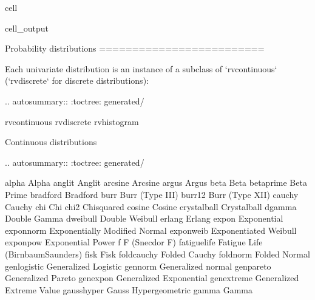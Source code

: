 \documentclass[letterpaper,10pt,english]{jupyterBook}
\begin{document}
\begin{sphinxuseclass}{cell}
\begin{sphinxVerbatimOutput}
\begin{sphinxuseclass}{cell_output}
\begin{sphinxVerbatim}[commandchars=\\\{\}]
Probability distributions
=========================

Each univariate distribution is an instance of a subclass of `rv\PYGZus{}continuous`
(`rv\PYGZus{}discrete` for discrete distributions):

.. autosummary::
   :toctree: generated/

   rv\PYGZus{}continuous
   rv\PYGZus{}discrete
   rv\PYGZus{}histogram

Continuous distributions
\PYGZhy{}\PYGZhy{}\PYGZhy{}\PYGZhy{}\PYGZhy{}\PYGZhy{}\PYGZhy{}\PYGZhy{}\PYGZhy{}\PYGZhy{}\PYGZhy{}\PYGZhy{}\PYGZhy{}\PYGZhy{}\PYGZhy{}\PYGZhy{}\PYGZhy{}\PYGZhy{}\PYGZhy{}\PYGZhy{}\PYGZhy{}\PYGZhy{}\PYGZhy{}\PYGZhy{}

.. autosummary::
   :toctree: generated/

   alpha             \PYGZhy{}\PYGZhy{} Alpha
   anglit            \PYGZhy{}\PYGZhy{} Anglit
   arcsine           \PYGZhy{}\PYGZhy{} Arcsine
   argus             \PYGZhy{}\PYGZhy{} Argus
   beta              \PYGZhy{}\PYGZhy{} Beta
   betaprime         \PYGZhy{}\PYGZhy{} Beta Prime
   bradford          \PYGZhy{}\PYGZhy{} Bradford
   burr              \PYGZhy{}\PYGZhy{} Burr (Type III)
   burr12            \PYGZhy{}\PYGZhy{} Burr (Type XII)
   cauchy            \PYGZhy{}\PYGZhy{} Cauchy
   chi               \PYGZhy{}\PYGZhy{} Chi
   chi2              \PYGZhy{}\PYGZhy{} Chi\PYGZhy{}squared
   cosine            \PYGZhy{}\PYGZhy{} Cosine
   crystalball       \PYGZhy{}\PYGZhy{} Crystalball
   dgamma            \PYGZhy{}\PYGZhy{} Double Gamma
   dweibull          \PYGZhy{}\PYGZhy{} Double Weibull
   erlang            \PYGZhy{}\PYGZhy{} Erlang
   expon             \PYGZhy{}\PYGZhy{} Exponential
   exponnorm         \PYGZhy{}\PYGZhy{} Exponentially Modified Normal
   exponweib         \PYGZhy{}\PYGZhy{} Exponentiated Weibull
   exponpow          \PYGZhy{}\PYGZhy{} Exponential Power
   f                 \PYGZhy{}\PYGZhy{} F (Snecdor F)
   fatiguelife       \PYGZhy{}\PYGZhy{} Fatigue Life (Birnbaum\PYGZhy{}Saunders)
   fisk              \PYGZhy{}\PYGZhy{} Fisk
   foldcauchy        \PYGZhy{}\PYGZhy{} Folded Cauchy
   foldnorm          \PYGZhy{}\PYGZhy{} Folded Normal
   genlogistic       \PYGZhy{}\PYGZhy{} Generalized Logistic
   gennorm           \PYGZhy{}\PYGZhy{} Generalized normal
   genpareto         \PYGZhy{}\PYGZhy{} Generalized Pareto
   genexpon          \PYGZhy{}\PYGZhy{} Generalized Exponential
   genextreme        \PYGZhy{}\PYGZhy{} Generalized Extreme Value
   gausshyper        \PYGZhy{}\PYGZhy{} Gauss Hypergeometric
   gamma             \PYGZhy{}\PYGZhy{} Gamma

\end{sphinxVerbatim}
\end{sphinxuseclass}
\end{sphinxVerbatimOutput}
\end{sphinxuseclass}
\end{document}
